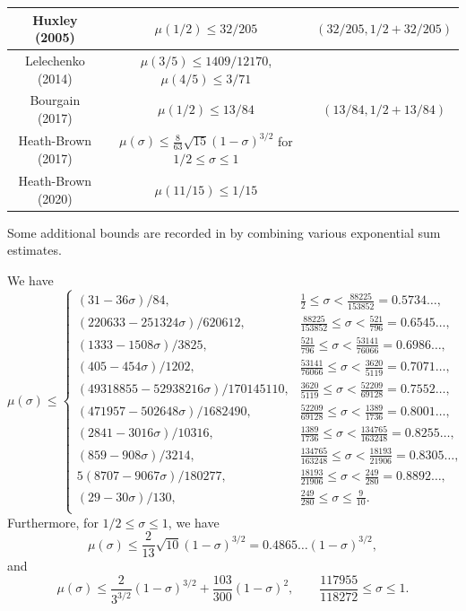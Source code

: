 \begin{table}[ht]
\begin{tabular}{|c|c|c|}
\hline
Huxley (2005) \cite{huxley_exponential_2005} & $\mu(1/2) \leq 32/205$ & $(32/205, 1/2+32/205)$ \\
\hline
Lelechenko (2014) \cite{Lelechenko_linear_2014} & $\mu(3/5) \leq 1409/12170$, $\mu(4/5) \leq 3/71$& \\
\hline
Bourgain (2017) \cite{bourgain_decoupling_2017} & $\mu(1/2) \leq 13/84$ & $(13/84, 1/2+13/84)$ \\
\hline
Heath-Brown (2017) \cite{heathbrown_new_2017} & $\mu(\sigma) \le \frac{8}{63}\sqrt{15}(1 - \sigma)^{3/2}$ for $1/2 \le \sigma \le 1$& \\
\hline
Heath-Brown (2020) \cite{demeter_small_2020} & $\mu(11/15) \leq 1/15$& \\
\hline
\end{tabular}
\end{table}\label{mu-table}

\literature
{}

Some additional bounds are recorded in \cite{trudgian-yang} by combining various exponential sum estimates. 

\begin{theorem}\label{mu_est_thm}\cite[Theorems 2.4-2.6]{trudgian-yang}
    We have
    \[
    \mu(\sigma) \le \begin{cases}
         (31 - 36\sigma)/84 , & \frac{1}{2} \leq\sigma < \frac{88225}{153852} = 0.5734\ldots, \\
         (220633 - 251324\sigma)/620612 , & \frac{88225}{153852} \leq\sigma < \frac{521}{796} = 0.6545\ldots, \\
         (1333 - 1508\sigma)/3825 , & \frac{521}{796} \leq\sigma < \frac{53141}{76066} = 0.6986\ldots, \\
         (405 - 454\sigma)/1202 , & \frac{53141}{76066} \leq\sigma < \frac{3620}{5119} = 0.7071\ldots, \\
         (49318855 - 52938216\sigma)/170145110 , & \frac{3620}{5119} \leq\sigma < \frac{52209}{69128} = 0.7552\ldots, \\
         (471957 - 502648\sigma)/1682490 , & \frac{52209}{69128} \leq\sigma < \frac{1389}{1736} = 0.8001\ldots, \\
         (2841 - 3016\sigma)/10316 , & \frac{1389}{1736} \leq\sigma < \frac{134765}{163248} = 0.8255\ldots, \\
         (859 - 908\sigma)/3214 , & \frac{134765}{163248} \leq\sigma < \frac{18193}{21906} = 0.8305\ldots, \\
         5(8707 - 9067\sigma)/180277 , & \frac{18193}{21906} \leq\sigma < \frac{249}{280} = 0.8892\ldots, \\
         (29 - 30\sigma)/130 , & \frac{249}{280} \leq\sigma \leq \frac{9}{10}.\\
    \end{cases}
    \]
    Furthermore, for $1/2 \le \sigma \le 1$, we have
\[
\mu(\sigma) \le \frac{2}{13}\sqrt{10}(1 - \sigma)^{3/2} = 0.4865\ldots(1 - \sigma)^{3/2},
\]
and
\[
\mu(\sigma) \le \frac{2}{3^{3/2}}(1 - \sigma)^{3/2} + \frac{103}{300}(1 - \sigma)^{2},\qquad \frac{117955}{118272} \le \sigma \le 1.
\]
\end{theorem}

